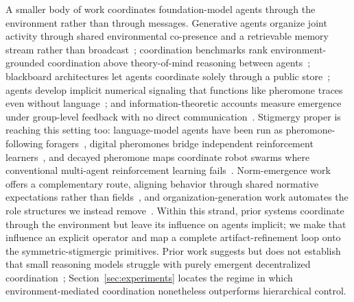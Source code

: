 A smaller body of work coordinates foundation-model agents through the environment rather than through messages. Generative agents organize joint activity through shared environmental co-presence and a retrievable memory stream rather than broadcast~\cite{park2023generative}; coordination benchmarks rank environment-grounded coordination above theory-of-mind reasoning between agents~\cite{agashe2025coordination}; blackboard architectures let agents coordinate solely through a public store~\cite{han2025blackboard}; agents develop implicit numerical signaling that functions like pheromone traces even without language~\cite{buscemi2026implicit}; and information-theoretic accounts measure emergence under group-level feedback with no direct communication~\cite{riedl2025emergent}. Stigmergy proper is reaching this setting too: language-model agents have been run as pheromone-following foragers~\cite{jimenez2025swarm}, digital pheromones bridge independent reinforcement learners~\cite{xu2022stigmergic}, and decayed pheromone maps coordinate robot swarms where conventional multi-agent reinforcement learning fails~\cite{aina2025smadrl}. Norm-emergence work offers a complementary route, aligning behavior through shared normative expectations rather than fields~\cite{ren2024norms,savarimuthu2024norms}, and organization-generation work automates the role structures we instead remove~\cite{amaral2023organisations}. Within this strand, prior systems coordinate through the environment but leave its influence on agents implicit; we make that influence an explicit operator and map a complete artifact-refinement loop onto the symmetric-stigmergic primitives. Prior work suggests but does not establish that small reasoning models struggle with purely emergent decentralized coordination~\cite{valmeekam2023planning}; Section~\ref{sec:experiments} locates the regime in which environment-mediated coordination nonetheless outperforms hierarchical control.
